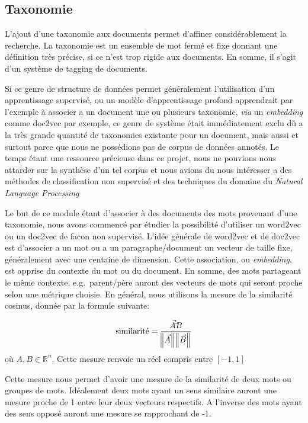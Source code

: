 
\subsection{Taxonomie}%
L'ajout d'une taxonomie aux documents permet d'affiner considérablement la recherche.
La taxonomie est un ensemble de mot fermé et fixe donnant une définition très précise, si ce n'est trop rigide aux documents.
En somme, il s'agit d'un système de tagging de documents. 

Si ce genre de structure de données permet généralement l'utilisation d'un apprentissage supervisé, ou un modèle d'apprentissage profond apprendrait par l'exemple à associer a un document une ou plusieurs taxonomie, \textit{via} un \textit{embedding} comme doc2vec\cite{doc2vec} par exemple, ce genre de système était immédiatement exclu dû a la très grande quantité de taxonomies existante pour un document, mais aussi et surtout parce que nous ne possédions pas de corpus de données annotés.
Le temps étant une ressource précieuse dans ce projet, nous ne pouvions nous attarder sur la synthèse d'un tel corpus et nous avions du nous intéresser a des méthodes de classification non supervisé et des techniques du domaine du \textit{Natural Language Processing}

Le but de ce module étant d'associer à des documents des mots provenant d'une taxonomie, nous avons commencé par étudier la possibilité d'utiliser un word2vec\cite{word2vec} ou un doc2vec de facon non supervisé.
L'idée générale de word2vec et de doc2vec est d'associer a un mot ou a un paragraphe/document un vecteur de taille fixe, généralement avec une centaine de dimension. Cette association, ou \textit{embedding}, est apprise du contexte du mot ou du document.
En somme, des mots partageant le même contexte, e.g.\ parent/père auront des vecteurs de mots qui seront proche selon une métrique choisie.
En général, nous utilisons la mesure de la similarité cosinus, donnée par la formule suivante:

\begin{equation}
	\text{similarité} = \frac{\vec{A} \dot \vec{B}}{\norm{\vec{A}}\norm{\vec{B}}}
\end{equation}
où $A, B  \in \mathbb{R}^n$. Cette mesure renvoie un réel compris entre $[-1, 1]$

Cette mesure nous permet d'avoir une mesure de la similarité de deux mots ou groupes de mots.
Idéalement deux mots ayant un sens similaire auront une mesure proche de 1 entre leur deux vecteurs respectifs.
A l'inverse des mots ayant des sens opposé auront une mesure se rapprochant de -1. 

